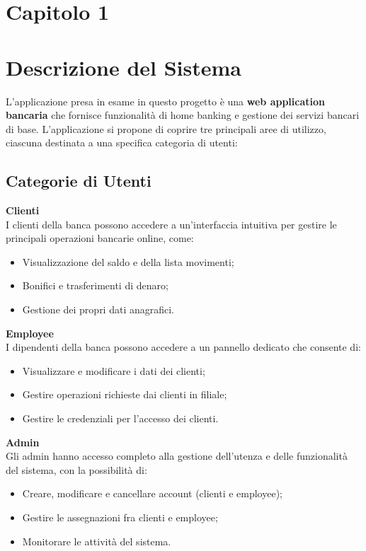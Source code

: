\section*{Capitolo 1}
\section{Descrizione del Sistema}

L'applicazione presa in esame in questo progetto è una \textbf{web application bancaria} che fornisce funzionalità di home banking e gestione dei servizi bancari di base. L'applicazione si propone di coprire tre principali aree di utilizzo, ciascuna destinata a una specifica categoria di utenti:

\subsection{Categorie di Utenti}

\textbf{Clienti}\\
I clienti della banca possono accedere a un'interfaccia intuitiva per gestire le principali operazioni bancarie online, come:
\begin{itemize}
	\item Visualizzazione del saldo e della lista movimenti;
	\item Bonifici e trasferimenti di denaro;
	\item Gestione dei propri dati anagrafici.
\end{itemize}
\textbf{Employee}\\
I dipendenti della banca possono accedere a un pannello dedicato che consente di:
\begin{itemize}
	\item Visualizzare e modificare i dati dei clienti;
	\item Gestire operazioni richieste dai clienti in filiale;
	\item Gestire le credenziali per l'accesso dei clienti.
\end{itemize}
\textbf{Admin}\\
Gli admin hanno accesso completo alla gestione dell'utenza e delle funzionalità del sistema, con la possibilità di:
\begin{itemize}
	\item Creare, modificare e cancellare account (clienti e employee);
	\item Gestire le assegnazioni fra clienti e employee;
	\item Monitorare le attività del sistema.
\end{itemize}

